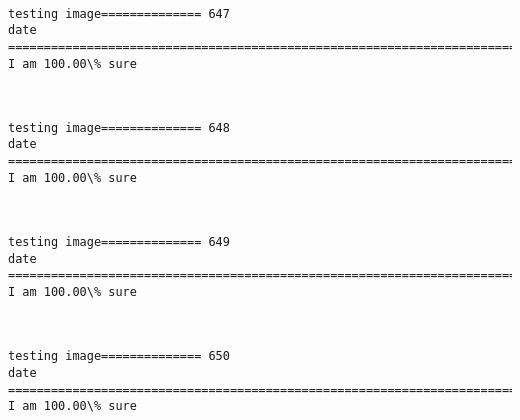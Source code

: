 \documentclass[11pt]{article}
\begin{document}
    \begin{center}
    \end{center}
    { \hspace*{\fill} \\}
    
    \begin{Verbatim}[commandchars=\\\{\}]
testing image============== 647
date
============================================================================
I am 100.00\% sure

    \end{Verbatim}

    \begin{center}
    \end{center}
    { \hspace*{\fill} \\}
    
    \begin{Verbatim}[commandchars=\\\{\}]
testing image============== 648
date
============================================================================
I am 100.00\% sure

    \end{Verbatim}

    \begin{center}
    \end{center}
    { \hspace*{\fill} \\}
    
    \begin{Verbatim}[commandchars=\\\{\}]
testing image============== 649
date
============================================================================
I am 100.00\% sure

    \end{Verbatim}

    \begin{center}
    \end{center}
    { \hspace*{\fill} \\}
    
    \begin{Verbatim}[commandchars=\\\{\}]
testing image============== 650
date
============================================================================
I am 100.00\% sure

    \end{Verbatim}
\end{document}
